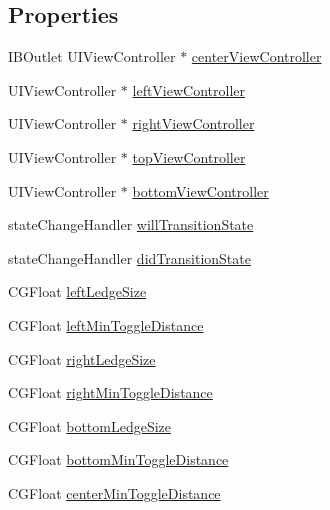 \subsection*{Properties}
\begin{DoxyCompactItemize}
\item 
I\-B\-Outlet U\-I\-View\-Controller $\ast$ \hyperlink{interface_k_l_circle_view_controller_a1b18d36e82e8bcbb3ceb88fc35ba255d}{center\-View\-Controller}
\item 
U\-I\-View\-Controller $\ast$ \hyperlink{interface_k_l_circle_view_controller_a659f3c61b551e9c4693bae2453822274}{left\-View\-Controller}
\item 
U\-I\-View\-Controller $\ast$ \hyperlink{interface_k_l_circle_view_controller_a2dbd44e3d1f0ab5e262cfae8f9a22044}{right\-View\-Controller}
\item 
U\-I\-View\-Controller $\ast$ \hyperlink{interface_k_l_circle_view_controller_adbeb75072f87e8b0f0b48f26bd146a99}{top\-View\-Controller}
\item 
U\-I\-View\-Controller $\ast$ \hyperlink{interface_k_l_circle_view_controller_a5b38b48e4771aff4fedbc45d25c3e14a}{bottom\-View\-Controller}
\item 
state\-Change\-Handler \hyperlink{interface_k_l_circle_view_controller_a567f1e84ab4a5fb86fb9e526c471c1b7}{will\-Transition\-State}
\item 
state\-Change\-Handler \hyperlink{interface_k_l_circle_view_controller_a6567be383fb25fca18a02eee82f34be7}{did\-Transition\-State}
\item 
C\-G\-Float \hyperlink{interface_k_l_circle_view_controller_af0b91974b3c8a36b53d7e295b226e9db}{left\-Ledge\-Size}
\item 
C\-G\-Float \hyperlink{interface_k_l_circle_view_controller_a4d4c3965dc85bb995db031ea1edacc6a}{left\-Min\-Toggle\-Distance}
\item 
C\-G\-Float \hyperlink{interface_k_l_circle_view_controller_aa373705476fa68a853df552c0d6564a1}{right\-Ledge\-Size}
\item 
C\-G\-Float \hyperlink{interface_k_l_circle_view_controller_a5dcc2ddeefd5abf04b651d269d9bd2aa}{right\-Min\-Toggle\-Distance}
\item 
C\-G\-Float \hyperlink{interface_k_l_circle_view_controller_a0b1ab24cc903aa300593eea290726347}{bottom\-Ledge\-Size}
\item 
C\-G\-Float \hyperlink{interface_k_l_circle_view_controller_a6511b48e6e57adba02cf10977a300049}{bottom\-Min\-Toggle\-Distance}
\item 
C\-G\-Float \hyperlink{interface_k_l_circle_view_controller_aa9a4807e51d3a892ea996db5ced2826b}{center\-Min\-Toggle\-Distance}
\end{DoxyCompactItemize}


